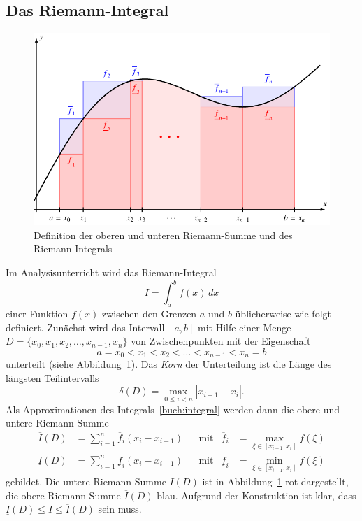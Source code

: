 \subsection{Das Riemann-Integral
\label{buch:subsection:riemann}}
\begin{figure}
\centering
\includegraphics{chapters/40-integration/figures/riemann.pdf}
\caption{Definition der oberen und unteren Riemann-Summe und des
Riemann-Integrals
%
\label{buch:figure:riemann}}
\end{figure}
Im Analysisunterricht wird das Riemann-Integral
%
\begin{equation}
I = \int_a^b f(x)\,dx
\label{buch:integral}
\end{equation}
einer Funktion $f(x)$ zwischen den Grenzen $a$ und $b$ üblicherweise
wie folgt definiert.
Zunächst wird das Intervall $[a,b]$ mit Hilfe einer Menge
$D=\{x_0,x_1,x_2,\dots,x_{n-1}, x_n\}$
von Zwischenpunkten mit der Eigenschaft
\[
a=x_0 < x_1 < x_2 < \dots < x_{n-1} < x_n = b
\]
unterteilt (siehe Abbildung~\ref{buch:figure:riemann}).
%
Das {\em Korn} der Unterteilung ist die Länge des längsten Teilintervalls
%
\[
\delta(D) = \max_{0\le i< n} |x_{i+1}-x_i|.
\]
Als Approximationen des Integrals~\eqref{buch:integral} werden dann die
%
obere und untere Riemann-Summe
%
%
%
\begin{align*}
\overline{I}(D)
&=
\sum_{i=1}^n \overline{f}_i (x_i-x_{i-1})
&&\text{mit}
&\overline{f}_i
&=
\max_{\xi\in [x_{i-1},x_i]} f(\xi)
\\
\underline{I}(D)
&=
\sum_{i=1}^n \underline{f}_i (x_i-x_{i-1})
&&\text{mit}
&\underline{f}_i
&=
\min_{\xi\in [x_{i-1},x_i]} f(\xi)
\end{align*}
gebildet.
Die untere Riemann-Summe $\underline{I}(D)$ ist in
Abbildung~\ref{buch:figure:riemann} rot dargestellt, die obere Riemann-Summe
$\overline{I}(D)$ blau.
Aufgrund der Konstruktion ist klar, dass
$\underline{I}(D) \le I \le \overline{I}(D)$
sein muss.

